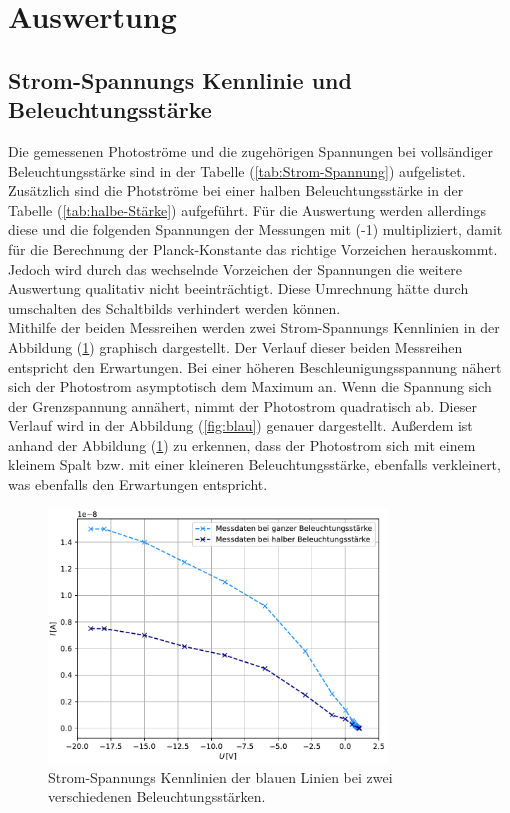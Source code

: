\nocite{anleitungV500}
\section{Auswertung}
\label{sec:Auswertung}

\subsection{Strom-Spannungs Kennlinie und Beleuchtungsstärke}
Die gemessenen Photoströme und die zugehörigen Spannungen bei vollsändiger Beleuchtungsstärke sind in der Tabelle (\ref{tab:Strom-Spannung}) aufgelistet. 
Zusätzlich sind die Photströme bei einer halben Beleuchtungsstärke in der Tabelle (\ref{tab:halbe-Stärke}) aufgeführt.
Für die Auswertung werden allerdings diese und die folgenden Spannungen der Messungen mit (-1) multipliziert, damit für die Berechnung der Planck-Konstante 
das richtige Vorzeichen herauskommt. Jedoch wird durch das wechselnde Vorzeichen der Spannungen die weitere Auswertung qualitativ nicht beeinträchtigt. Diese
Umrechnung hätte durch umschalten des Schaltbilds verhindert werden können. \\
Mithilfe der beiden Messreihen werden zwei Strom-Spannungs Kennlinien in der Abbildung (\ref{fig:Plot1}) graphisch dargestellt. Der Verlauf dieser beiden
Messreihen entspricht den Erwartungen. Bei einer höheren Beschleunigungsspannung nähert sich der Photostrom asymptotisch dem Maximum an. Wenn die Spannung sich
der Grenzspannung annähert, nimmt der Photostrom quadratisch ab. Dieser Verlauf wird in der Abbildung (\ref{fig:blau}) genauer dargestellt. Außerdem ist anhand der Abbildung (\ref{fig:Plot1})
zu erkennen, dass der Photostrom sich mit einem kleinem Spalt bzw. mit einer kleineren Beleuchtungsstärke, ebenfalls verkleinert, was ebenfalls den Erwartungen entspricht. 
\begin{figure}[H]
    \centering
    \includegraphics[width=0.8\textwidth]{Plots/Plot1.pdf}
    \caption{Strom-Spannungs Kennlinien der blauen Linien bei zwei verschiedenen Beleuchtungsstärken.}
    \label{fig:Plot1}
\end{figure}
